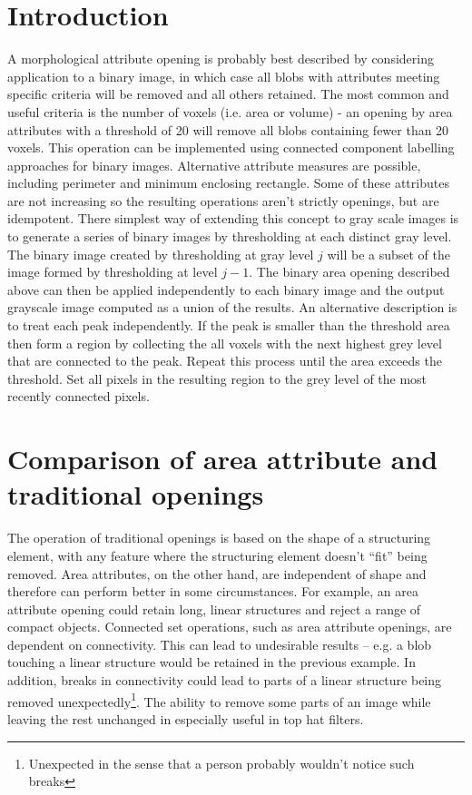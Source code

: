 \documentclass{InsightArticle}
\begin{document}
\section{Introduction}
A morphological attribute opening is probably best described by
considering application to a binary image, in which case all blobs
with attributes meeting specific criteria will be removed and all
others retained. The most common and useful criteria is the number of
voxels (i.e. area or volume) - an opening by area attributes with a
threshold of 20 will remove all blobs containing fewer than 20
voxels. This operation can be implemented using connected component
labelling approaches for binary images. Alternative attribute measures
are possible, including perimeter and minimum enclosing
rectangle\cite{Breen96}. Some of these attributes are not increasing
so the resulting operations aren't strictly openings, but are
idempotent.  There simplest way of extending this concept to gray
scale images is to generate a series of binary images by thresholding
at each distinct gray level. The binary image created by thresholding
at gray level $j$ will be a subset of the image formed by thresholding
at level $j-1$. The binary area opening described above can then be
applied independently to each binary image and the output grayscale
image computed as a union of the results.  An alternative description
is to treat each peak independently. If the peak is smaller than the
threshold area then form a region by collecting the all voxels with
the next highest grey level that are connected to the peak. Repeat
this process until the area exceeds the threshold. Set all pixels in
the resulting region to the grey level of the most recently connected
pixels.
\section{Comparison of area attribute and traditional openings}
The operation of traditional openings is based on the shape of a
structuring element, with any feature where the structuring element
doesn't ``fit'' being removed. Area attributes, on the other hand, are
independent of shape and therefore can perform better in some
circumstances. For example, an area attribute opening could retain
long, linear structures and reject a range of compact
objects. Connected set operations, such as area attribute openings,
are dependent on connectivity. This can lead to undesirable results --
e.g. a blob touching a linear structure would be retained in the
previous example. In addition, breaks in connectivity could lead to
parts of a linear structure being removed
unexpectedly\footnote{Unexpected in the sense that a person probably
wouldn't notice such breaks}. The ability to remove some parts of an
image while leaving the rest unchanged in especially useful in top hat
filters.
\end{document}

